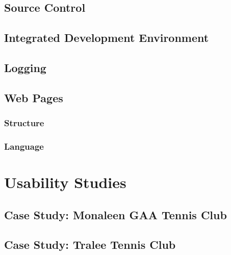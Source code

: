 \subsection{Source Control}

\subsection{Integrated Development Environment}

\subsection{Logging}

\subsection{Web Pages}

\subsubsection{Structure}

\subsubsection{Language}

\section{Usability Studies}

\subsection{Case Study: Monaleen GAA Tennis Club}

\subsection{Case Study: Tralee Tennis Club}